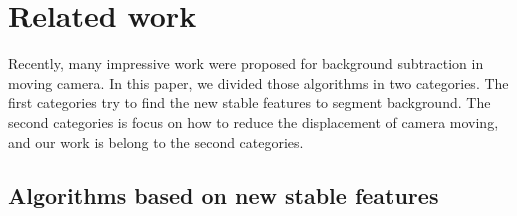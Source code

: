\documentclass[journal]{IEEEtran}
\begin{document}

\section{Related work}
\indent Recently, many impressive work were proposed for background subtraction
in moving camera. In this paper, we divided those algorithms in two
categories. The first categories try to find the new stable features to
segment background. The second categories is focus on how to reduce
the displacement of camera moving, and our work is belong to the second
categories.
\subsection{Algorithms based on new stable features}
\end{document}

